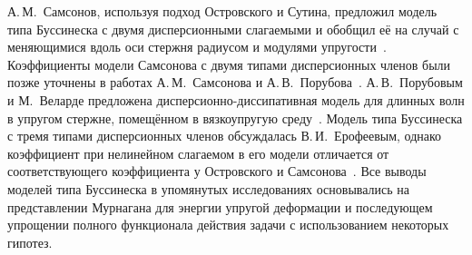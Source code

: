 \documentclass[12pt, a4paper]{report}
\begin{document}
А.\,М.~Самсонов, используя подход Островского и Сутина, предложил модель типа Буссинеска с двумя дисперсионными слагаемыми и обобщил её на случай с меняющимися вдоль оси стержня радиусом и модулями упругости~\cite{S_book}. Коэффициенты модели Самсонова с двумя типами дисперсионных членов были позже уточнены в работах А.\,М.~Самсонова и А.\,В.~Порубова~\cite{SP}.
А.\,В.~Порубовым и М.~Веларде предложена дисперсионно-диссипативная модель для длинных волн в упругом стержне, помещённом в вязкоупругую среду~\cite{PV}.
Модель типа Буссинеска с тремя типами дисперсионных членов обсуждалась В.\,И.~Ерофеевым, однако коэффициент при нелинейном слагаемом в его модели отличается от соответствующего коэффициента у Островского и Самсонова~\cite{E_book}. Все выводы моделей типа Буссинеска в упомянутых исследованиях основывались на представлении Мурнагана для энергии упругой деформации и последующем упрощении полного функционала действия задачи с использованием некоторых гипотез. 
\end{document}
